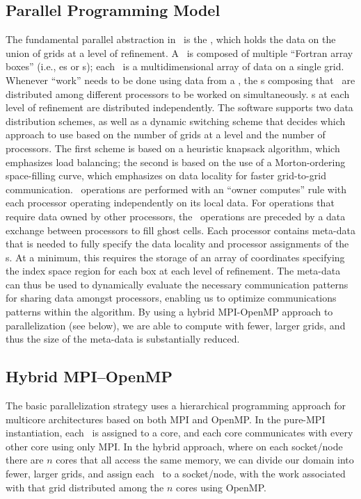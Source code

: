 \subsection{Parallel Programming Model}

The fundamental parallel abstraction in \BoxLib\ is the \MultiFab, which holds the data on the 
union of grids at a level of refinement.  A \MultiFab\ is composed of multiple ``Fortran array boxes''
(i.e., \FArrayBox es or \Fab s); each \Fab\ is a multidimensional array of data on a single grid. 
Whenever ``work'' needs to be done using data from a \MultiFab, the 
\Fab s composing that \MultiFab\ are distributed among different processors 
to be worked on simultaneously.  \Fab s at each level of refinement are distributed 
independently.  The software supports two data distribution schemes, as well as a 
dynamic switching scheme that decides which approach to use based on the number of 
grids at a level and the number of processors.  The first scheme is based on a 
heuristic knapsack algorithm, which emphasizes load balancing; the second is based on 
the use of a Morton-ordering space-filling curve, which emphasizes on data locality for
faster grid-to-grid communication. 
\MultiFab\ operations are performed with an ``owner computes'' rule 
with each processor operating independently on its local data.  For operations that 
require data owned by other processors, the \MultiFab\ operations are preceded by a 
data exchange between processors to fill ghost cells.  Each processor contains 
meta-data that is needed 
to fully specify the data locality and processor assignments of the \Fab s. At a 
minimum, this requires the storage of an array of coordinates specifying the index space 
region for each box at each level of refinement.  The meta-data can thus be used to 
dynamically evaluate the necessary communication patterns for sharing data amongst 
processors, enabling us to optimize communications patterns within the algorithm.
By using a hybrid MPI-OpenMP approach to parallelization (see below), we are able to 
compute with fewer, larger grids, and thus the size of the meta-data is substantially 
reduced.

\subsection{Hybrid MPI--OpenMP}

The basic parallelization strategy uses a hierarchical programming approach for 
multicore architectures based on both MPI and OpenMP.  In the pure-MPI instantiation, 
each \Fab\ is assigned to a core, and each core communicates 
with every other core using only MPI.  In the hybrid approach, where on each socket/node 
there are $n$ cores that all access the same memory, we can divide our domain into
fewer, larger grids, and assign each \Fab\ to a socket/node, 
with the work associated with that grid distributed among the $n$ 
cores using OpenMP.

